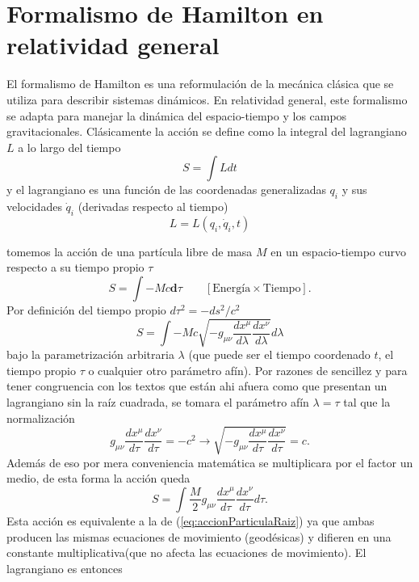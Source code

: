 \chapter{Formalismo de Hamilton en relatividad general}
\label{chap:hamilton}
El formalismo de Hamilton es una reformulación de la mecánica clásica que se utiliza para describir sistemas dinámicos. En relatividad general, este formalismo se adapta para manejar la dinámica del espacio-tiempo y los campos gravitacionales. 
Clásicamente la acción se define como la integral del lagrangiano $L$ a lo largo del tiempo
\[
S = \int L dt
\]  
y el lagrangiano es una función de las coordenadas generalizadas $q_i$ y sus velocidades $\dot{q}_i$ (derivadas respecto al tiempo)
\[
L = L(q_i, \dot{q}_i, t)
\]

tomemos la acción de una partícula libre de masa $M$ en un espacio-tiempo curvo respecto a su tiempo propio $\tau$
\begin{equation}
    S = \int -Mc \mathbf{d}\tau  \qquad [\text{Energía} \times \text{Tiempo}]. 
\end{equation}
Por definición del tiempo propio $d\tau^2 = -ds^2/c^2$
\begin{equation}
    S = \int -Mc \sqrt{-g_{\mu \nu} \frac{dx^\mu}{d\lambda} \frac{dx^\nu}{d\lambda}} d\lambda
    \label{eq:accionParticulaRaiz}
\end{equation} 
bajo la parametrización arbitraria $\lambda$ (que puede ser el tiempo coordenado $t$, el tiempo propio $\tau$ o cualquier otro parámetro afín).
Por razones de sencillez y para tener congruencia con los textos que están ahi afuera como \cite[p. 45]{wald-1984} que presentan un lagrangiano sin la raíz cuadrada, se tomara el parámetro afín $\lambda = \tau$ tal que la normalización
\begin{equation}
    g_{\mu \nu} \frac{dx^\mu}{d\tau} \frac{dx^\nu}{d\tau} = -c^2 \rightarrow \sqrt{-g_{\mu \nu} \frac{dx^\mu}{d\tau} \frac{dx^\nu}{d\tau}} = c.
\end{equation}
Además de eso por mera conveniencia matemática se multiplicara por el factor un medio, de esta forma la acción queda
\begin{equation}
    S  =  \int \frac{M}{2}  g_{\mu \nu} \frac{dx^\mu}{d\tau} \frac{dx^\nu}{d\tau} d\tau.
\end{equation}
Esta acción es equivalente a la de (\ref{eq:accionParticulaRaiz}) ya que ambas producen las mismas ecuaciones de movimiento (geodésicas) y difieren en una constante multiplicativa(que no afecta las ecuaciones de movimiento).
El lagrangiano es entonces
